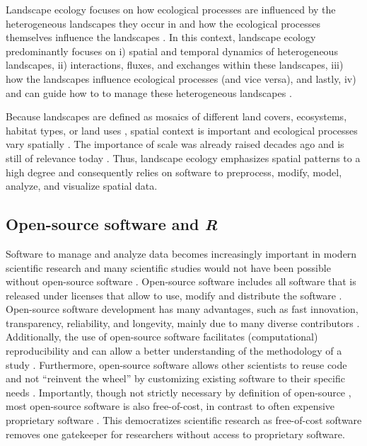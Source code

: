 \documentclass[smallextended]{svjour3}       %
\begin{document}
Landscape ecology focuses on how ecological processes are influenced by the heterogeneous landscapes they occur in and how the ecological processes themselves influence the landscapes \cite{Turner1989,Turner2005,With2019}.
In this context, landscape ecology predominantly focuses on i) spatial and temporal dynamics of heterogeneous landscapes, ii) interactions, fluxes, and exchanges within these landscapes, iii) how the landscapes influence ecological processes (and vice versa), and lastly, iv) and can guide how to to manage these heterogeneous landscapes \cite{Risser1984,Turner1989}.

Because landscapes are defined as mosaics of different land covers, ecosystems, habitat types, or land uses \cite{Forman1986,Forman1995,Wiens1995}, spatial context is important and ecological processes vary spatially \cite{With2019}.
The importance of scale was already raised decades ago \cite{Wiens1989,Levin1992,Jelinski1996} and is still of relevance today \cite{Simova2012,Estes2018}.
Thus, landscape ecology emphasizes spatial patterns to a high degree \cite{Risser1984} and consequently relies on software to preprocess, modify, model, analyze, and visualize spatial data.

\hypertarget{sec:open_source}{%
\subsection{\texorpdfstring{Open-source software and \emph{R}}{Open-source software and R}}\label{sec:open_source}}

Software to manage and analyze data becomes increasingly important in modern scientific research \cite{Wilson2014} and many scientific studies would not have been possible without open-source software \cite{Prlic2012}.
Open-source software includes all software that is released under licenses that allow to use, modify and distribute the software \cite{St.Laurent2008}.
Open-source software development has many advantages, such as fast innovation, transparency, reliability, and longevity, mainly due to many diverse contributors \cite{vonKrogh2006,St.Laurent2008}.
Additionally, the use of open-source software facilitates (computational) reproducibility and can allow a better understanding of the methodology of a study \cite{Prlic2012,Powers2019}.
Furthermore, open-source software allows other scientists to reuse code and not ``reinvent the wheel'' \cite{Prlic2012} by customizing existing software to their specific needs \cite{Steiniger2009}.
Importantly, though not strictly necessary by definition of open-source \cite{Steiniger2009,Steiniger2009a}, most open-source software is also free-of-cost, in contrast to often expensive proprietary software \cite{vonKrogh2006,Steiniger2009,Steiniger2009a}.
This democratizes scientific research as free-of-cost software removes one gatekeeper for researchers without access to proprietary software.
\end{document}
